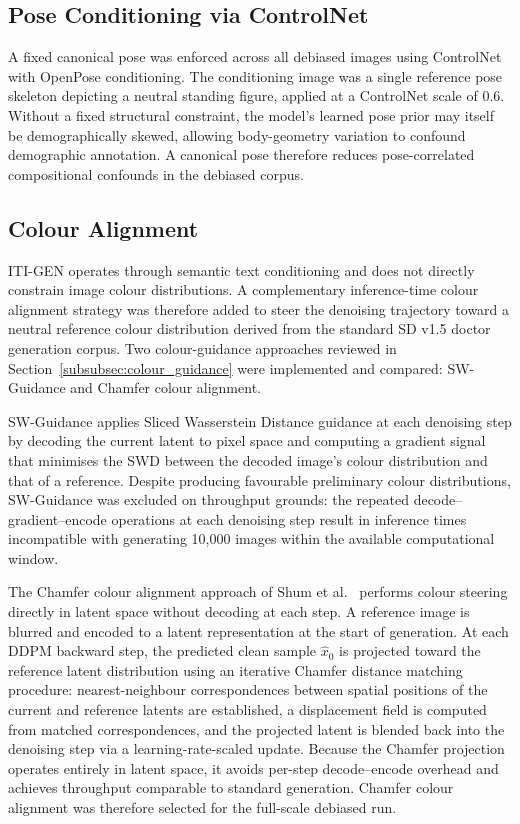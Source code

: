 \subsection{Pose Conditioning via ControlNet}
\label{subsec:debias_controlnet}

A fixed canonical pose was enforced across all debiased images using ControlNet \cite{LZhang_2023_ControlNet} with OpenPose conditioning. The conditioning image was a single reference pose skeleton depicting a neutral standing figure, applied at a ControlNet scale of 0.6. Without a fixed structural constraint, the model's learned pose prior may itself be demographically skewed, allowing body-geometry variation to confound demographic annotation. A canonical pose therefore reduces pose-correlated compositional confounds in the debiased corpus.

\subsection{Colour Alignment}
\label{subsec:colour_alignment}

ITI-GEN operates through semantic text conditioning and does not directly constrain image colour distributions. A complementary inference-time colour alignment strategy was therefore added to steer the denoising trajectory toward a neutral reference colour distribution derived from the standard SD v1.5 doctor generation corpus. Two colour-guidance approaches reviewed in Section~\ref{subsubsec:colour_guidance} were implemented and compared: SW-Guidance and Chamfer colour alignment.

SW-Guidance \cite{Lobashev_2025_SWGuidance} applies Sliced Wasserstein Distance guidance at each denoising step by decoding the current latent to pixel space and computing a gradient signal that minimises the SWD between the decoded image's colour distribution and that of a reference. Despite producing favourable preliminary colour distributions, SW-Guidance was excluded on throughput grounds: the repeated decode--gradient--encode operations at each denoising step result in inference times incompatible with generating 10,000 images within the available computational window.

The Chamfer colour alignment approach of Shum et al.\ \cite{Shum_2025_ColorAlignment} performs colour steering directly in latent space without decoding at each step. A reference image is blurred and encoded to a latent representation at the start of generation. At each DDPM backward step, the predicted clean sample $\hat{x}_0$ is projected toward the reference latent distribution using an iterative Chamfer distance matching procedure: nearest-neighbour correspondences between spatial positions of the current and reference latents are established, a displacement field is computed from matched correspondences, and the projected latent is blended back into the denoising step via a learning-rate-scaled update. Because the Chamfer projection operates entirely in latent space, it avoids per-step decode--encode overhead and achieves throughput comparable to standard generation. Chamfer colour alignment was therefore selected for the full-scale debiased run.

